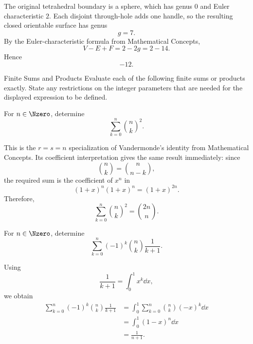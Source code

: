     \begin{solution}
        The original tetrahedral boundary is a sphere, which has genus $0$ and
        Euler characteristic $2$. Each disjoint through-hole adds one handle,
        so the resulting closed orientable surface has genus
        \[
            g=7.
        \]
        By the Euler-characteristic formula from Mathematical Concepts,
        \[
            V-E+F=2-2g=2-14.
        \]
        Hence
        \[
            \boxed{-12}.
        \]
    \end{solution}


    \begin{expectedproblemgroup}{Finite Sums and Products}
        Evaluate each of the following finite sums or products exactly. State any
        restrictions on the integer parameters that are needed for the displayed
        expression to be defined.

        \begin{expectedsubproblem}
            For $n\in\Nzero$, determine
            \[
                \sum_{k=0}^{n}\binom{n}{k}^2.
            \]
        \end{expectedsubproblem}

        \begin{expectedsubsolution}
            This is the $r=s=n$ specialization of Vandermonde's identity from
            Mathematical Concepts. Its coefficient interpretation gives the
            same result immediately: since
            \[
                \binom{n}{k}=\binom{n}{n-k},
            \]
            the required sum is the coefficient of $x^n$ in
            \[
                (1+x)^n(1+x)^n=(1+x)^{2n}.
            \]
            Therefore,
            \[
                \boxed{
                    \sum_{k=0}^{n}\binom{n}{k}^2=\binom{2n}{n}
                }.
            \]
        \end{expectedsubsolution}

        \begin{expectedsubproblem}
            For $n\in\Nzero$, determine
            \[
                \sum_{k=0}^{n}
                (-1)^k\binom{n}{k}\frac{1}{k+1}.
            \]
        \end{expectedsubproblem}

        \begin{expectedsubsolution}
            Using
            \[
                \frac{1}{k+1}=\int_0^1x^k\dd x,
            \]
            we obtain
            \[
                \begin{aligned}
                    \sum_{k=0}^{n}
                    (-1)^k\binom{n}{k}\frac{1}{k+1}
                    &=
                    \int_0^1
                    \sum_{k=0}^{n}\binom{n}{k}(-x)^k\dd x\\
                    &=
                    \int_0^1(1-x)^n\dd x\\
                    &=
                    \boxed{\frac{1}{n+1}}.
                \end{aligned}
            \]
        \end{expectedsubsolution}


\end{expectedproblemgroup}
